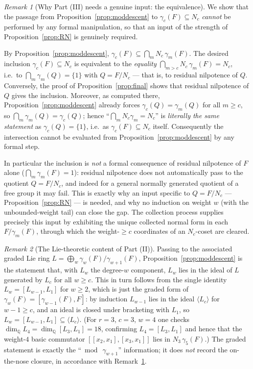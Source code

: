 \documentclass{amsart}
\theoremstyle{definition}
\theoremstyle{remark}
\newtheorem{remark}{Remark}
\begin{document}
\begin{remark}[Why Part (III) needs a genuine input: the equivalence]
\label{rem:gap}
We show that the passage from Proposition~\ref{prop:moddescent} to
$\gamma_c(F)\subseteq N_c$ \emph{cannot} be performed by any formal manipulation,
so that an input of the strength of Proposition~\ref{prop:RN} is genuinely
required.

By Proposition~\ref{prop:moddescent}, $\gamma_c(F)\subseteq\bigcap_{m}
N_c\,\gamma_m(F)$. The desired inclusion $\gamma_c(F)\subseteq N_c$ is equivalent
to the \emph{equality} $\bigcap_{m>c}N_c\,\gamma_m(F)=N_c$, i.e.\ to
$\bigcap_{m}\gamma_m(Q)=\{1\}$ with $Q=F/N_c$ --- that is, to residual nilpotence
of $Q$. Conversely, the proof of Proposition~\ref{prop:final} shows that residual
nilpotence of $Q$ gives the inclusion. Moreover, as computed there,
Proposition~\ref{prop:moddescent} already forces $\gamma_c(Q)=\gamma_m(Q)$ for all
$m\ge c$, so $\bigcap_m\gamma_m(Q)=\gamma_c(Q)$; hence
``$\bigcap_m N_c\gamma_m=N_c$'' is \emph{literally the same statement} as
$\gamma_c(Q)=\{1\}$, i.e.\ as $\gamma_c(F)\subseteq N_c$ itself. Consequently the
intersection cannot be evaluated from Proposition~\ref{prop:moddescent} by any
formal step.

In particular the inclusion is \emph{not} a formal consequence of residual
nilpotence of $F$ alone ($\bigcap_m\gamma_m(F)=1$): residual nilpotence does not
automatically pass to the quotient $Q=F/N_c$, and indeed for a general normally
generated quotient of a free group it may fail. This is exactly why an input
specific to $Q=F/N_c$ --- Proposition~\ref{prop:RN} --- is needed, and why no
induction on weight $w$ (with the unbounded-weight tail) can close the gap. The
collection process supplies precisely this input by exhibiting the unique
collected normal form in each $F/\gamma_m(F)$, through which the weight-$\ge c$
coordinates of an $N_c$-coset are cleared.
\end{remark}

\begin{remark}[The Lie-theoretic content of Part (II)]\label{rem:lie}
Passing to the associated graded Lie ring
$L=\bigoplus_{w}\gamma_w(F)/\gamma_{w+1}(F)$, Proposition~\ref{prop:moddescent} is
the statement that, with $L_w$ the degree-$w$ component, $L_w$ lies in the ideal of
$L$ generated by $L_c$ for all $w\ge c$. This in turn follows from the single
identity $L_w=[L_{w-1},L_1]$ for $w\ge2$, which is just the graded form of
$\gamma_w(F)=[\gamma_{w-1}(F),F]$: by induction $L_{w-1}$ lies in the ideal
$\langle L_c\rangle$ for $w-1\ge c$, and an ideal is closed under bracketing with
$L_1$, so $L_w=[L_{w-1},L_1]\subseteq\langle L_c\rangle$. (For $r=3$, $c=3$, $w=4$
one checks $\dim_{\mathbb Q}L_4=\dim_{\mathbb Q}[L_3,L_1]=18$, confirming
$L_4=[L_3,L_1]$ and hence that the weight-$4$ basic commutator
$[[x_2,x_1],[x_3,x_1]]$ lies in $N_3\,\gamma_5(F)$.) The graded statement is
exactly the ``$\bmod\ \gamma_{w+1}$'' information; it does \emph{not} record the
on-the-nose closure, in accordance with Remark~\ref{rem:gap}.
\end{remark}
\end{document}
